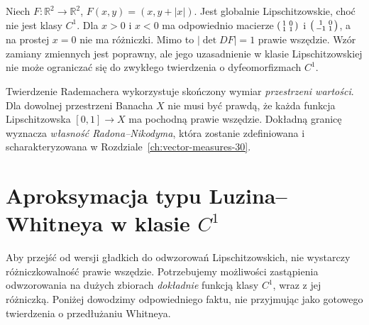 \begin{przyklad}
Niech $F:\mathbb R^2\to\mathbb R^2$,
$F(x,y)=(x,y+|x|)$. Jest globalnie Lipschitzowskie,
choć nie jest klasy $C^1$. Dla $x>0$ i $x<0$
ma odpowiednio macierze $\begin{psmallmatrix}1&0\\1&1\end{psmallmatrix}$
i $\begin{psmallmatrix}1&0\\-1&1\end{psmallmatrix}$,
a na prostej $x=0$ nie ma różniczki. Mimo to
$|\det DF|=1$ prawie wszędzie. Wzór zamiany
zmiennych jest poprawny, ale jego uzasadnienie
w klasie Lipschitzowskiej nie może ograniczać się
do zwykłego twierdzenia o dyfeomorfizmach $C^1$.
\end{przyklad}

\begin{uwaga}
Twierdzenie Rademachera wykorzystuje skończony wymiar
\emph{przestrzeni wartości}. Dla dowolnej przestrzeni
Banacha $X$ nie musi być prawdą, że każda funkcja
Lipschitzowska $[0,1]\to X$ ma pochodną prawie wszędzie.
Dokładną granicę wyznacza \emph{własność Radona--Nikodyma},
która zostanie zdefiniowana i scharakteryzowana w
Rozdziale~\ref{ch:vector-measures-30}.
\end{uwaga}

\section{Aproksymacja typu Luzina--Whitneya w klasie $C^1$}
Aby przejść od wersji gładkich do odwzorowań Lipschitzowskich,
nie wystarczy różniczkowalność prawie wszędzie. Potrzebujemy
możliwości zastąpienia odwzorowania na dużych zbiorach
\emph{dokładnie} funkcją klasy $C^1$, wraz z jej różniczką.
Poniżej dowodzimy odpowiedniego faktu, nie przyjmując
jako gotowego twierdzenia o przedłużaniu Whitneya.


